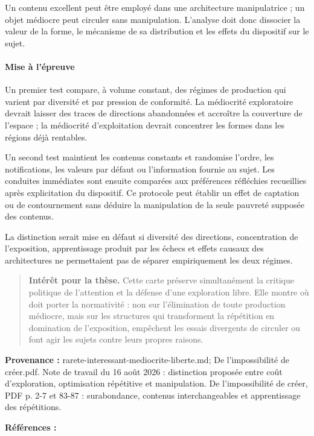 \documentclass[10pt,a4paper]{article}
\begin{document}
Un contenu excellent peut être employé dans une architecture manipulatrice ; un objet médiocre peut circuler sans manipulation. L'analyse doit donc dissocier la valeur de la forme, le mécanisme de sa distribution et les effets du dispositif sur le sujet.

\paragraph{Mise à l'épreuve}
Un premier test compare, à volume constant, des régimes de production qui varient par diversité et par pression de conformité. La médiocrité exploratoire devrait laisser des traces de directions abandonnées et accroître la couverture de l'espace ; la médiocrité d'exploitation devrait concentrer les formes dans les régions déjà rentables.

Un second test maintient les contenus constants et randomise l'ordre, les notifications, les valeurs par défaut ou l'information fournie au sujet. Les conduites immédiates sont ensuite comparées aux préférences réfléchies recueillies après explicitation du dispositif. Ce protocole peut établir un effet de captation ou de contournement sans déduire la manipulation de la seule pauvreté supposée des contenus.

La distinction serait mise en défaut si diversité des directions, concentration de l'exposition, apprentissage produit par les échecs et effets causaux des architectures ne permettaient pas de séparer empiriquement les deux régimes.

\begin{quote}
\textbf{Intérêt pour la thèse.} Cette carte préserve simultanément la critique politique de l'attention et la défense d'une exploration libre. Elle montre où doit porter la normativité : non sur l'élimination de toute production médiocre, mais sur les structures qui transforment la répétition en domination de l'exposition, empêchent les essais divergents de circuler ou font agir les sujets contre leurs propres raisons.
\end{quote}
{\footnotesize\color{metadata}\textbf{Provenance :} rarete-interessant-mediocrite-liberte.md; De l'impossibilité de créer.pdf. Note de travail du 16 août 2026 : distinction proposée entre coût d'exploration, optimisation répétitive et manipulation. De l'impossibilité de créer, PDF p. 2-7 et 83-87 : surabondance, contenus interchangeables et apprentissage des répétitions.\par}
{\footnotesize\color{metadata}\textbf{Références :} \parencite{debord1967spectacle,muray2005festivus,stiegler2010pharmacologie,pachet2026impossibilite}\par}
\end{document}
